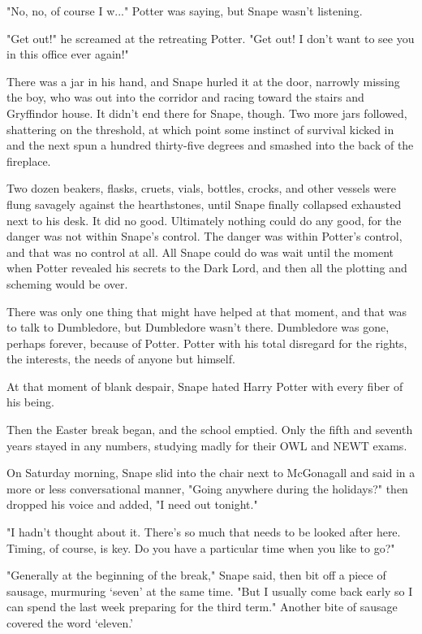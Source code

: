 "No, no, of course I w..." Potter was saying, but Snape wasn't listening.

"Get out!" he screamed at the retreating Potter. "Get out! I don't want to see you in this office ever again!"

There was a jar in his hand, and Snape hurled it at the door, narrowly missing the boy, who was out into the corridor and racing toward the stairs and Gryffindor house. It didn't end there for Snape, though. Two more jars followed, shattering on the threshold, at which point some instinct of survival kicked in and the next spun a hundred thirty-five degrees and smashed into the back of the fireplace.

Two dozen beakers, flasks, cruets, vials, bottles, crocks, and other vessels were flung savagely against the hearthstones, until Snape finally collapsed exhausted next to his desk. It did no good. Ultimately nothing could do any good, for the danger was not within Snape's control. The danger was within Potter's control, and that was no control at all. All Snape could do was wait until the moment when Potter revealed his secrets to the Dark Lord, and then all the plotting and scheming would be over.

There was only one thing that might have helped at that moment, and that was to talk to Dumbledore, but Dumbledore wasn't there. Dumbledore was gone, perhaps forever, because of Potter. Potter with his total disregard for the rights, the interests, the needs of anyone but himself.

At that moment of blank despair, Snape hated Harry Potter with every fiber of his being.

Then the Easter break began, and the school emptied. Only the fifth and seventh years stayed in any numbers, studying madly for their OWL and NEWT exams.

On Saturday morning, Snape slid into the chair next to McGonagall and said in a more or less conversational manner, "Going anywhere during the holidays?" then dropped his voice and added, "I need out tonight."

"I hadn't thought about it. There's so much that needs to be looked after here. Timing, of course, is key. Do you have a particular time when you like to go?"

"Generally at the beginning of the break," Snape said, then bit off a piece of sausage, murmuring `seven' at the same time. "But I usually come back early so I can spend the last week preparing for the third term." Another bite of sausage covered the word `eleven.'

